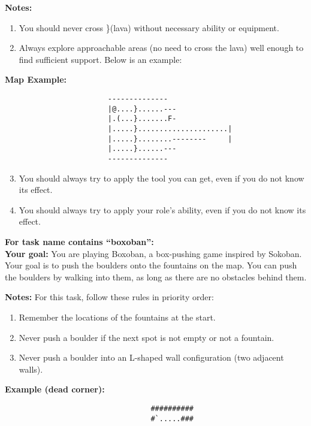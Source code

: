\begin{MyGreenBox}[frametitle={\textbf{Iteration 2 MiniHack Prompt}}]
\textbf{Notes:}
\begin{enumerate}
  \item You should never cross \}(lava) without necessary ability or equipment.
  \item Always explore approachable areas (no need to cross the lava) well enough to find sufficient support. Below is an example:
\end{enumerate}

\textbf{Map Example:}
\begin{verbatim}
                        --------------
                        |@....}......---
                        |.(...}.......F-
                        |.....}.....................|
                        |.....}........--------     |
                        |.....}......---
                        --------------
\end{verbatim}

\begin{enumerate}\setcounter{enumi}{2}
  \item You should always try to apply the tool you can get, even if you do not know its effect.
  \item You should always try to apply your role’s ability, even if you do not know its effect.
\end{enumerate}


\textbf{For task name contains “boxoban”:}\\
\textbf{Your goal:} You are playing Boxoban, a box-pushing game inspired by Sokoban. Your goal is to push the boulders onto the fountains on the map. You can push the boulders by walking into them, as long as there are no obstacles behind them.

\textbf{Notes:}  
For this task, follow these rules in priority order:
\begin{enumerate}
  \item Remember the locations of the fountains at the start.
  \item Never push a boulder if the next spot is not empty or not a fountain.
  \item Never push a boulder into an L-shaped wall configuration (two adjacent walls).
\end{enumerate}

\textbf{Example (dead corner):}
\begin{verbatim}
                                  ##########
                                  #`.....###
\end{verbatim}


\end{MyGreenBox}
